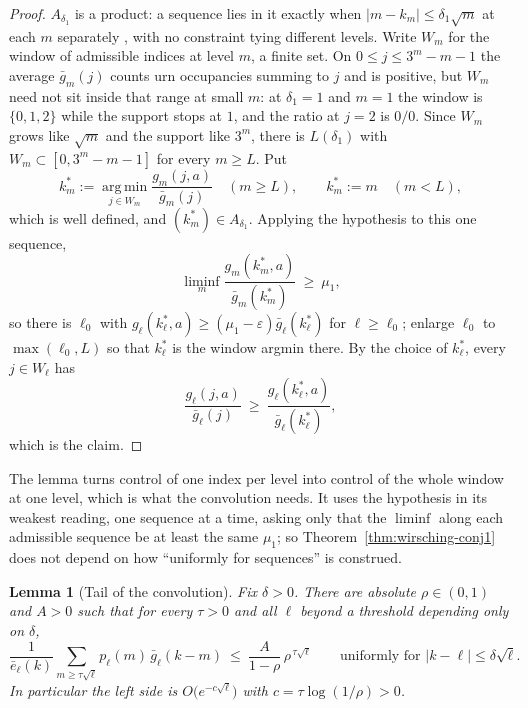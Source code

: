 \documentclass[11pt]{article}
\newtheorem{lemma}[theorem]{Lemma}
\theoremstyle{definition}
\theoremstyle{remark}
\begin{document}
\begin{proof}
$A_{\delta_1}$ is a product: a sequence lies in it exactly when
$|m-k_m|\le\delta_1\sqrt m$ at each $m$ separately
\cite[eq.~(1.5)]{Wirsching2003}, with no constraint tying different
levels. Write $W_m$ for the window of admissible indices at level $m$, a
finite set. On $0\le j\le3^m-m-1$ the average $\bar g_m(j)$ counts urn
occupancies summing to $j$ and is positive, but $W_m$ need not sit
inside that range at small $m$: at $\delta_1=1$ and $m=1$ the window is
$\{0,1,2\}$ while the support stops at $1$, and the ratio at $j=2$ is
$0/0$. Since $W_m$ grows like $\sqrt m$ and the support like $3^m$,
there is $L(\delta_1)$ with $W_m\subset[0,3^m-m-1]$ for every $m\ge L$.
Put
\[
 k^*_m:=\operatorname*{arg\,min}_{j\in W_m}
 \frac{g_m(j,a)}{\bar g_m(j)}\quad(m\ge L),
 \qquad k^*_m:=m\quad(m<L),
\]
which is well defined, and $(k^*_m)\in A_{\delta_1}$. Applying the
hypothesis to this one sequence,
\[
 \liminf_m \frac{g_m(k^*_m,a)}{\bar g_m(k^*_m)}\ \ge\ \mu_1 ,
\]
so there is $\ell_0$ with
$g_\ell(k^*_\ell,a)\ge(\mu_1-\varepsilon)\bar g_\ell(k^*_\ell)$ for
$\ell\ge\ell_0$; enlarge $\ell_0$ to $\max(\ell_0,L)$ so that
$k^*_\ell$ is the window argmin there. By the choice of $k^*_\ell$,
every $j\in W_\ell$ has
\[
 \frac{g_\ell(j,a)}{\bar g_\ell(j)}\ \ge\
 \frac{g_\ell(k^*_\ell,a)}{\bar g_\ell(k^*_\ell)},
\]
which is the claim.
\end{proof}

The lemma turns control of one index per level into control of the
whole window at one level, which is what the convolution needs. It uses
the hypothesis in its weakest reading, one sequence at a time, asking
only that the $\liminf$ along each admissible sequence be at least the
same $\mu_1$; so Theorem~\ref{thm:wirsching-conj1} does not depend on
how ``uniformly for sequences'' is construed.

\begin{lemma}[Tail of the convolution]\label{lem:conv-tail}
Fix $\delta>0$. There are absolute $\rho\in(0,1)$ and $A>0$ such that
for every $\tau>0$ and all $\ell$ beyond a threshold depending only on
$\delta$,
\[
 \frac{1}{\bar e_\ell(k)}\sum_{m\ge\tau\sqrt\ell}p_\ell(m)\,
 \bar g_\ell(k-m)\ \le\ \frac{A}{1-\rho}\,\rho^{\,\tau\sqrt\ell}
 \qquad\text{uniformly for }|k-\ell|\le\delta\sqrt\ell .
\]
In particular the left side is $O\bigl(e^{-c\sqrt\ell}\bigr)$ with
$c=\tau\log(1/\rho)>0$.
\end{lemma}
\end{document}
